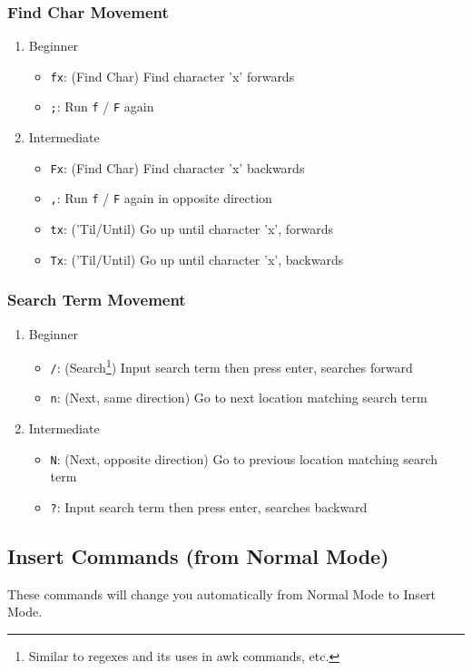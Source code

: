 \documentclass[11pt]{article}
\begin{document}
\subsubsection{Find Char Movement}
\label{sec:orgf75845b}
\begin{enumerate}
\item Beginner
\label{sec:org0e86b46}
\begin{itemize}
\item \texttt{fx}: (Find Char) Find character 'x' forwards
\item \texttt{;}: Run \texttt{f} / \texttt{F} again
\end{itemize}
\item Intermediate
\label{sec:orgfbf7017}
\begin{itemize}
\item \texttt{Fx}: (Find Char) Find character 'x' backwards
\item \texttt{,}: Run \texttt{f} / \texttt{F} again in opposite direction
\item \texttt{tx}: ('Til/Until) Go up until character 'x', forwards
\item \texttt{Tx}: ('Til/Until) Go up until character 'x', backwards
\end{itemize}
\end{enumerate}
\subsubsection{Search Term Movement}
\label{sec:org59c3c79}
\begin{enumerate}
\item Beginner
\label{sec:org4a645c8}
\begin{itemize}
\item \texttt{/}: (Search\footnote{Similar to regexes and its uses in awk commands, etc.}) Input search term then press enter, searches forward
\item \texttt{n}: (Next, same direction) Go to next location matching search term
\end{itemize}
\item Intermediate
\label{sec:org76792da}
\begin{itemize}
\item \texttt{N}: (Next, opposite direction) Go to previous location matching search term
\item \texttt{?}: Input search term then press enter, searches backward
\end{itemize}
\end{enumerate}
\subsection{Insert Commands (from Normal Mode)}
\label{sec:orgab87128}
These commands will change you automatically from Normal Mode to Insert Mode.
\end{document}
